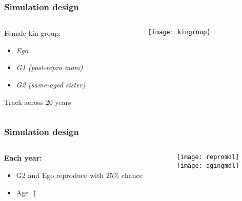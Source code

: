 \documentclass{beamer}
\begin{document}

\begin{frame}
\frametitle{Simulation design}

\begin{columns}
\begin{column}{.5\textwidth}

Female kin group: \\
\begin{itemize}
\item \emph{Ego} \\
\item \emph{G1 (post-repro mom)} \\
\item \emph{G2 (same-aged sister)} \\
\end{itemize}
\vspace{0.5cm}
Track across 20 years

\end{column}

\begin{column}{.5\textwidth}
\texttt{[image: kingroup]}\\
\end{column}
\end{columns}

\end{frame}


\begin{frame}
\frametitle{Simulation design}

\begin{columns}
\begin{column}{.5\textwidth}
\textbf{Each year:}
\begin{itemize}
\item G2 and Ego reproduce with 25\% chance \\
\vspace{0.5cm}
\item Age $\uparrow$
\end{itemize}
\end{column}

\begin{column}{.5\textwidth}
\centering
\texttt{[image: repromdl]}\\
\texttt{[image: agingmdl]}
\end{column}

\end{columns}
\end{frame}
\end{document}
